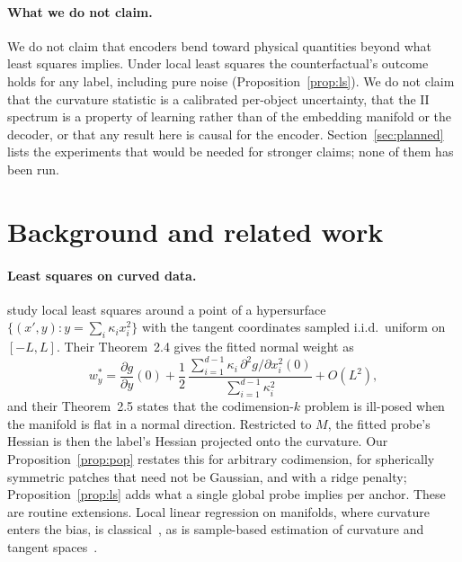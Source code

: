 \documentclass[10pt]{article}
\newcommand{\II}{\mathrm{II}}
\begin{document}
\paragraph{What we do not claim.} We do not claim that encoders bend toward physical quantities beyond what least squares implies. Under local least squares the counterfactual's outcome holds for any label, including pure noise (Proposition~\ref{prop:ls}). We do not claim that the curvature statistic is a calibrated per-object uncertainty, that the $\II$ spectrum is a property of learning rather than of the embedding manifold or the decoder, or that any result here is causal for the encoder. Section~\ref{sec:planned} lists the experiments that would be needed for stronger claims; none of them has been run.

\section{Background and related work}
\label{sec:related}

\paragraph{Least squares on curved data.} \citet{liu2023linear} study local least squares around a point of a hypersurface $\{(x',y): y=\sum_i\kappa_i x_i^2\}$ with the tangent coordinates sampled i.i.d.\ uniform on $[-L,L]$. Their Theorem~2.4 gives the fitted normal weight as
\[
w_y^*=\frac{\partial g}{\partial y}(0)+\frac{1}{2}\,\frac{\sum_{i=1}^{d-1}\kappa_i\,\partial^2 g/\partial x_i^2(0)}{\sum_{i=1}^{d-1}\kappa_i^2}+O(L^2),
\]
and their Theorem~2.5 states that the codimension-$k$ problem is ill-posed when the manifold is flat in a normal direction. Restricted to $M$, the fitted probe's Hessian is then the label's Hessian projected onto the curvature. Our Proposition~\ref{prop:pop} restates this for arbitrary codimension, for spherically symmetric patches that need not be Gaussian, and with a ridge penalty; Proposition~\ref{prop:ls} adds what a single global probe implies per anchor. These are routine extensions. Local linear regression on manifolds, where curvature enters the bias, is classical~\citep{cheng2013local}, as is sample-based estimation of curvature and tangent spaces~\citep{aamari2019nonasymptotic}.
\end{document}
